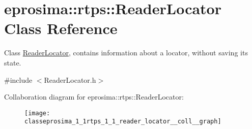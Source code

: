 \hypertarget{classeprosima_1_1rtps_1_1_reader_locator}{\section{eprosima\-:\-:rtps\-:\-:\-Reader\-Locator \-Class \-Reference}
\label{classeprosima_1_1rtps_1_1_reader_locator}
}


\-Class \hyperlink{classeprosima_1_1rtps_1_1_reader_locator}{\-Reader\-Locator}, contains information about a locator, without saving its state.  




{\ttfamily \#include $<$\-Reader\-Locator.\-h$>$}



\-Collaboration diagram for eprosima\-:\-:rtps\-:\-:\-Reader\-Locator\-:\nopagebreak
\begin{figure}[H]
\begin{center}
\leavevmode
\texttt{[image: classeprosima\_1\_1rtps\_1\_1\_reader\_locator\_\_coll\_\_graph]}
\end{center}
\end{figure}
